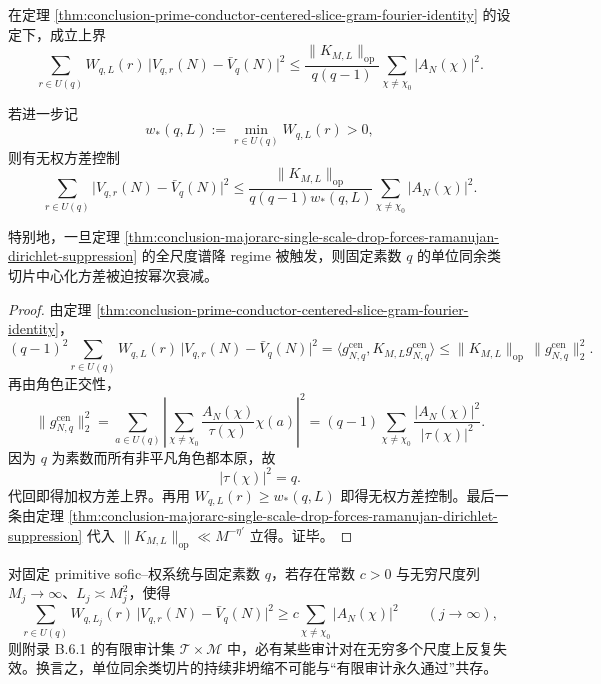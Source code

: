 \begin{corollary}[单位同余类中心化位势的加权方差坍缩律]\label{cor:conclusion-prime-conductor-centered-slice-weighted-variance-collapse}
在定理 \ref{thm:conclusion-prime-conductor-centered-slice-gram-fourier-identity} 的设定下，成立上界
\[
\sum_{r\in U(q)}W_{q,L}(r)\,
\bigl|V_{q,r}(N)-\bar V_q(N)\bigr|^2
\le
\frac{\|K_{M,L}\|_{\mathrm{op}}}{q(q-1)}
\sum_{\chi\neq \chi_0}|A_N(\chi)|^2.
\]

若进一步记
\[
w_*(q,L):=\min_{r\in U(q)}W_{q,L}(r)>0,
\]
则有无权方差控制
\[
\sum_{r\in U(q)}\bigl|V_{q,r}(N)-\bar V_q(N)\bigr|^2
\le
\frac{\|K_{M,L}\|_{\mathrm{op}}}{q(q-1)w_*(q,L)}
\sum_{\chi\neq \chi_0}|A_N(\chi)|^2.
\]

特别地，一旦定理 \ref{thm:conclusion-majorarc-single-scale-drop-forces-ramanujan-dirichlet-suppression} 的全尺度谱降 regime 被触发，则固定素数 \(q\) 的单位同余类切片中心化方差被迫按幂次衰减。
\end{corollary}
\begin{proof}
由定理 \ref{thm:conclusion-prime-conductor-centered-slice-gram-fourier-identity}，
\[
(q-1)^2
\sum_{r\in U(q)}W_{q,L}(r)\,
\bigl|V_{q,r}(N)-\bar V_q(N)\bigr|^2
=
\langle g_{N,q}^{\mathrm{cen}},K_{M,L}g_{N,q}^{\mathrm{cen}}\rangle
\le
\|K_{M,L}\|_{\mathrm{op}}\,
\|g_{N,q}^{\mathrm{cen}}\|_2^2.
\]
再由角色正交性，
\[
\|g_{N,q}^{\mathrm{cen}}\|_2^2
=
\sum_{a\in U(q)}
\left|
\sum_{\chi\neq \chi_0}\frac{A_N(\chi)}{\tau(\chi)}\chi(a)
\right|^2
=
(q-1)\sum_{\chi\neq \chi_0}\frac{|A_N(\chi)|^2}{|\tau(\chi)|^2}.
\]
因为 \(q\) 为素数而所有非平凡角色都本原，故
\[
|\tau(\chi)|^2=q.
\]
代回即得加权方差上界。再用 \(W_{q,L}(r)\ge w_*(q,L)\) 即得无权方差控制。最后一条由定理 \ref{thm:conclusion-majorarc-single-scale-drop-forces-ramanujan-dirichlet-suppression} 代入 \(\|K_{M,L}\|_{\mathrm{op}}\ll M^{-\eta'}\) 立得。证毕。
\end{proof}

\begin{conjecture}\label{conj:conclusion-dirichlet-slice-noncollapse-forces-repeated-finite-audit-failure}
对固定 primitive sofic--权系统与固定素数 \(q\)，若存在常数 \(c>0\) 与无穷尺度列 \(M_j\to\infty\)、\(L_j\asymp M_j^2\)，使得
\[
\sum_{r\in U(q)}W_{q,L_j}(r)\,
\bigl|V_{q,r}(N)-\bar V_q(N)\bigr|^2
\ge
c\sum_{\chi\neq \chi_0}|A_N(\chi)|^2
\qquad (j\to\infty),
\]
则附录 B.6.1 的有限审计集 \(\mathcal T\times \mathcal M\) 中，必有某些审计对在无穷多个尺度上反复失效。换言之，单位同余类切片的持续非坍缩不可能与“有限审计永久通过”共存。
\end{conjecture}
